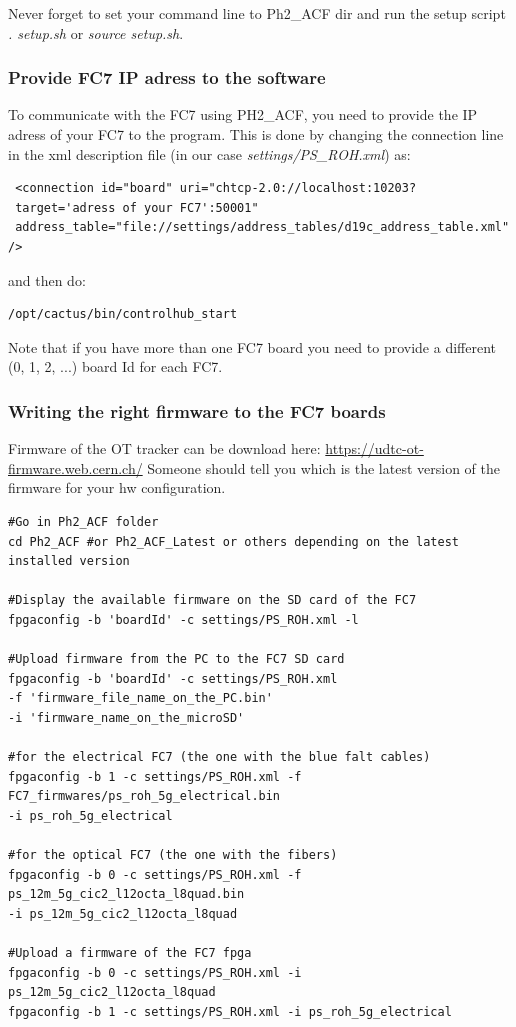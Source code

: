\documentclass[10pt,a4paper]{article}
\begin{document}
Never forget to set your command line to Ph2\_ACF dir and run the setup script \emph{. setup.sh} or \emph{source setup.sh}.

\subsubsection{Provide FC7 IP adress to the software}
To communicate with the FC7 using PH2\_ACF, you need to provide the IP adress of your FC7 to the program. This is done by changing the connection line in the xml description file (in our case \emph{settings/PS\_ROH.xml}) as:

\begin{framed}
\begin{verbatim}
 <connection id="board" uri="chtcp-2.0://localhost:10203?
 target='adress of your FC7':50001" 
 address_table="file://settings/address_tables/d19c_address_table.xml" />
\end{verbatim}
\end{framed}

and then do:
\begin{framed}
\begin{verbatim}
/opt/cactus/bin/controlhub_start
\end{verbatim}
\end{framed}

Note that if you have more than one FC7 board you need to provide a different (0, 1, 2, ...) board Id for each FC7.

\subsubsection{Writing the right firmware to the FC7 boards}
Firmware of the OT tracker can be download here: \url{https://udtc-ot-firmware.web.cern.ch/}
Someone should tell you which is the latest version of the firmware for your hw configuration.

\begin{framed}
\begin{verbatim}
#Go in Ph2_ACF folder
cd Ph2_ACF #or Ph2_ACF_Latest or others depending on the latest installed version

#Display the available firmware on the SD card of the FC7
fpgaconfig -b 'boardId' -c settings/PS_ROH.xml -l

#Upload firmware from the PC to the FC7 SD card
fpgaconfig -b 'boardId' -c settings/PS_ROH.xml 
-f 'firmware_file_name_on_the_PC.bin' 
-i 'firmware_name_on_the_microSD'

#for the electrical FC7 (the one with the blue falt cables)
fpgaconfig -b 1 -c settings/PS_ROH.xml -f FC7_firmwares/ps_roh_5g_electrical.bin 
-i ps_roh_5g_electrical

#for the optical FC7 (the one with the fibers)
fpgaconfig -b 0 -c settings/PS_ROH.xml -f ps_12m_5g_cic2_l12octa_l8quad.bin 
-i ps_12m_5g_cic2_l12octa_l8quad

#Upload a firmware of the FC7 fpga
fpgaconfig -b 0 -c settings/PS_ROH.xml -i  ps_12m_5g_cic2_l12octa_l8quad
fpgaconfig -b 1 -c settings/PS_ROH.xml -i ps_roh_5g_electrical
\end{verbatim}
\end{framed}
\end{document}
